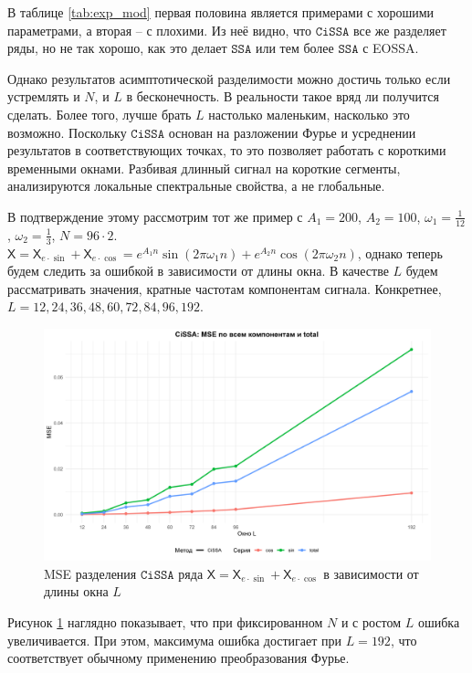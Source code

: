 \documentclass[12pt, specialist, subf
]{disser}
\theoremstyle{definition}
\newcommand{\SSA}{\texttt{SSA}}
\newcommand{\CISSA}{\texttt{CiSSA}}
\newcommand{\TS}{\mathsf{X}}
\begin{document}
В таблице \ref{tab:exp_mod} первая половина является примерами с хорошими параметрами, а вторая -- с плохими. Из неё видно, что $\CISSA$ все же разделяет ряды, но не так хорошо, как это делает $\SSA$ или тем более $\SSA$ с EOSSA.

Однако результатов асимптотической разделимости можно достичь только если устремлять и $N$, и $L$ в бесконечность. В реальности такое вряд ли получится сделать. Более того, лучше брать $L$ настолько маленьким, насколько это возможно. Поскольку $\CISSA$ основан на разложении Фурье и усреднении результатов в соответствующих точках, то это позволяет работать с короткими временными окнами. Разбивая длинный сигнал на короткие сегменты, анализируются локальные спектральные свойства, а не глобальные.

В подтверждение этому рассмотрим тот же пример с $A_1 = 200$, $A_2 = 100$, $\omega_1 = \frac{1}{12}$, $\omega_2 = \frac{1}{3}$, $N = 96 \cdot 2$. $\TS = \TS_{e\cdot\sin} + \TS_{e\cdot\cos} = e^{A_1 n } \sin(2\pi \omega_1 n ) + e^{A_2 n} \cos(2\pi \omega_2 n )$, однако теперь будем следить за ошибкой в зависимости от длины окна. В качестве $L$ будем рассматривать значения, кратные частотам компонентам сигнала. Конкретнее,  $L = 12, 24, 36, 48, 60, 72, 84, 96, 192$.

\begin{figure}[H]
	\centering
	\includegraphics[width=1\textwidth]{img/cissa_errors_plot.png}
	\caption{MSE разделения $\CISSA$ ряда $\TS = \TS_{e\cdot\sin} + \TS_{e\cdot\cos}$ в зависимости от длины окна $L$}
	\label{fig:cissa_error_depends_on_L}
\end{figure}

Рисунок \ref{fig:cissa_error_depends_on_L} наглядно показывает, что при фиксированном $N$ и с ростом $L$ ошибка увеличивается. При этом, максимума ошибка достигает при $L = 192$, что соответствует обычному применению преобразования Фурье.
\end{document}
